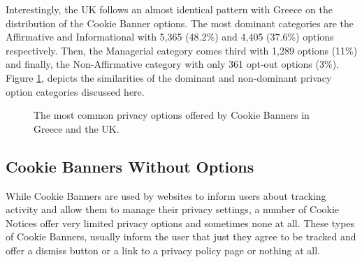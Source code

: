 \documentclass[../main.tex]{subfiles}
\begin{document}
Interestingly, the UK follows an almost identical pattern with Greece on the distribution of the Cookie Banner options. The most dominant categories are the Affirmative and Informational with 5,365 (48.2\%) and 4,405 (37.6\%) options respectively. Then, the Managerial category comes third with 1,289 options (11\%) and finally, the Non-Affirmative category with only 361 opt-out options (3\%). Figure \ref{fig:priv_categories_breakdown}, depicts the similarities of the dominant and non-dominant privacy option categories discussed here. 

\categories

\begin{figure}[ht]
    \centering
    \caption{The most common privacy options offered by Cookie Banners in Greece and the UK.}
    \label{fig:priv_categories_breakdown}
\end{figure}

\subsection{Cookie Banners Without Options}

While Cookie Banners are used by websites to inform users about tracking activity and allow them to manage their privacy settings, a number of Cookie Notices offer very limited privacy options and sometimes none at all. These types of Cookie Banners, usually inform the user that just  they agree to be tracked and offer a dismiss button or a link to a privacy policy page or nothing at all.
\end{document}
